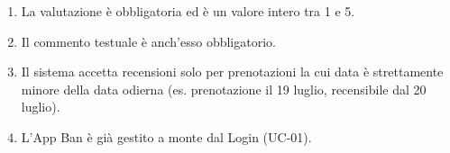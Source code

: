 \documentclass[border=10pt]{standalone}
\begin{document}
	{
		\begin{enumerate}[nosep, leftmargin=*]
			\item[•] La valutazione è obbligatoria ed è un valore intero tra 1 e 5.
			\item[•] Il commento testuale è anch'esso obbligatorio.
			\item[•] Il sistema accetta recensioni solo per prenotazioni la cui data è strettamente minore della data odierna (es. prenotazione il 19 luglio, recensibile dal 20 luglio).
			\item[•] L'App Ban è già gestito a monte dal Login (UC-01).
		\end{enumerate}
	}
\end{document}
